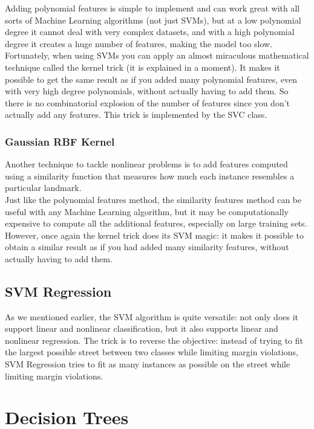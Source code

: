 \documentclass[french]{article}
\begin{document}
Adding polynomial features is simple to implement and can work great with all sorts of Machine Learning algorithms (not just SVMs), but at a low polynomial degree it cannot deal with very complex datasets, and with a high polynomial degree it creates a huge number of features, making the model too slow. \\

Fortunately, when using SVMs you can apply an almost miraculous mathematical technique called the kernel trick (it is explained in a moment). It makes it possible to get the same result as if you added many polynomial features, even with very high degree polynomials, without actually having to add them. So there is no combinatorial explosion of the number of features since you don’t actually add any features. This trick is implemented by the SVC class.

\subsubsection{Gaussian RBF Kernel}

Another technique to tackle nonlinear problems is to add features computed using a similarity function that measures how much each instance resembles a particular landmark. \\

Just like the polynomial features method, the similarity features method can be useful with any Machine Learning algorithm, but it may be computationally expensive to compute all the additional features, especially on large training sets. However, once again the kernel trick does its SVM magic: it makes it possible to obtain a similar result as if you had added many similarity features, without actually having to add them.

\subsection{SVM Regression}

As we mentioned earlier, the SVM algorithm is quite versatile: not only does it support linear and nonlinear classification, but it also supports linear and nonlinear regression. The trick is to reverse the objective: instead of trying to fit the largest possible street between two classes while limiting margin violations, SVM Regression tries to fit as many instances as possible on the street while limiting margin violations.

\section{Decision Trees}
\end{document}
